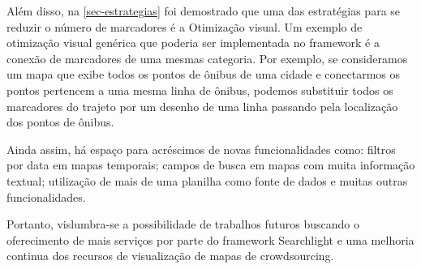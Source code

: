 Além disso, na \autoref{sec-estrategias} foi demostrado que uma das estratégias para se reduzir o número de marcadores é a Otimização visual. Um exemplo de otimização visual genérica que poderia ser implementada no framework é a conexão de marcadores de uma mesmas categoria. Por exemplo, se consideramos um mapa que exibe todos os pontos de ônibus de uma cidade e conectarmos os pontos pertencem a uma mesma linha de ônibus, podemos substituir todos os marcadores do trajeto por um desenho de uma linha passando pela localização dos pontos de ônibus. 

Ainda assim, há espaço para acréscimos de novas funcionalidades  como: filtros por data em mapas temporais; campos de busca em mapas com muita informação textual; utilização de mais de uma planilha como fonte de dados e muitas outras funcionalidades.  

Portanto, vislumbra-se a possibilidade de trabalhos futuros buscando o oferecimento de mais serviços por parte do framework Searchlight e uma melhoria continua dos recursos de visualização de mapas de crowdsourcing.
